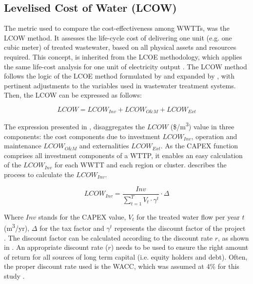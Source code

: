 

\subsection{Levelised Cost of Water (LCOW)}
The metric used to compare the cost-effectiveness among WWTTs, was the LCOW method. It assesses the life-cycle cost of delivering one unit (e.g. one cubic meter) of treated wastewater, based on all physical assets and resources required. This concept, is inherited from the LCOE methodology, which applies the same life-cost analysis for one unit of electricity output \cite{prospectscostcompetitive2013}. The LCOW method follows the logic of the LCOE method formulated by \cite{prospectscostcompetitive2013} and expanded by \cite{GeospatialLevelizedCost2015}, with pertinent adjustments to the variables used in wastewater treatment systems. Then, the LCOW can be expressed as follows:

\begin{equation}\label{eq:lcow}
LCOW = LCOW_{Inv} + LCOW_{O\&M} + LCOW_{Ext}
\end{equation}

The expression presented in , disaggregates the $LCOW$ (\$/m\textsuperscript{3}) value in three components: the cost components due to investment $LCOW_{Inv}$, operation and maintenance $LCOW_{O\&M}$ and externalities $LCOW_{Ext}$. As the CAPEX function comprises all investment components of a WTTP, it enables an easy calculation of the $LCOW_{Inv}$ for each WWTT and each region or cluster.  describes the process to calculate the $LCOW_{Inv}$.

\begin{equation}\label{eq:lcow_inv}
LCOW_{Inv} = \frac{Inv}{\sum_{t=1}^{T} V_{t}\cdot\gamma^{t}}\cdot\Delta
\end{equation}

Where $Inv$ stands for the CAPEX value, $V_{t}$ for the treated water flow per year $t$ (m\textsuperscript{3}/yr), $\Delta$ for the tax factor and $\gamma^{t}$ represents the discount factor of the project . The discount factor can be calculated according to the discount rate $r$, as shown in . An appropriate discount rate ($r$) needs to be used to ensure the right amount of return for all sources of long term capital (i.e. equity holders and debt). Often, the proper discount rate used is the WACC, which was assumed at 4\% for this study \cite{prospectscostcompetitive2013}. 

